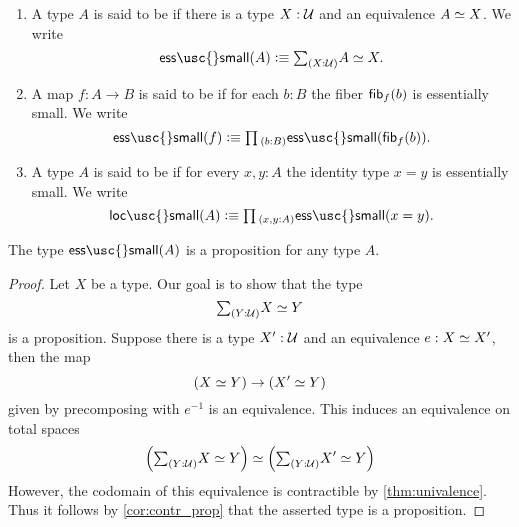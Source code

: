 \begin{defn}\label{defn:ess_small}
\begin{enumerate}
\item A type $A$ is said to be  if there is a type $X:\mathcal{U}$ and an equivalence $\eqv{A}{X}$. We write
\begin{equation*}
\mathsf{ess\usc{}small}(A)\defeq\sm{X:\UU}\eqv{A}{X}.
\end{equation*}
\item A map $f:A\to B$ is said to be  if for each $b:B$ the fiber $\mathsf{fib}_{f}(b)$ is essentially small.
We write
\begin{equation*}
\mathsf{ess\usc{}small}(f)\defeq\prd{b:B}\mathsf{ess\usc{}small}(\fib{f}{b}).
\end{equation*}
\item A type $A$ is said to be  if for every $x,y:A$ the identity type $x=y$ is essentially small.
We write
\begin{equation*}
\mathsf{loc\usc{}small}(A)\defeq \prd{x,y:A}\mathsf{ess\usc{}small}(x=y).
\end{equation*}
\end{enumerate}
\end{defn}

\begin{lem}\label{lem:isprop_ess_small}
The type $\mathsf{ess\usc{}small}(A)$ is a proposition for any type $A$.
\end{lem}

\begin{proof}
Let $X$ be a type. Our goal is to show that the type
\begin{equation*}
\sm{Y:\UU}\eqv{X}{Y}
\end{equation*}
is a proposition. Suppose there is a type $X':\mathcal{U}$ and an equivalence $e:\eqv{X}{X'}$, then the map
\begin{equation*}
(\eqv{X}{Y})\to (\eqv{X'}{Y})
\end{equation*}
given by precomposing with $e^{-1}$ is an equivalence. This induces an equivalence on total spaces
\begin{equation*}
\eqv{\Big(\sm{Y:\UU}\eqv{X}{Y}\Big)}{\Big(\sm{Y:\UU}\eqv{X'}{Y}\Big)}
\end{equation*}
However, the codomain of this equivalence is contractible by \cref{thm:univalence}. Thus it follows by \cref{cor:contr_prop} that the asserted type is a proposition.
\end{proof}

